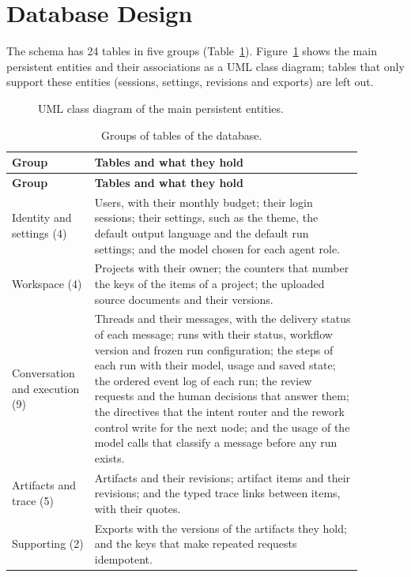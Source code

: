 \section{Database Design}
\label{sec:sd-database}

The schema has 24 tables in five groups (Table~\ref{tab:sd-tables}). Figure~\ref{fig:sd-domain-model} shows the main persistent entities and their associations as a UML class diagram; tables that only support these entities (sessions, settings, revisions and exports) are left out.

\begin{figure}[H]
    \centering
    \resizebox{\linewidth}{!}{}
    \caption{UML class diagram of the main persistent entities.}
    \label{fig:sd-domain-model}
\end{figure}

\begingroup{}
\begin{longtable}{|p{0.2\linewidth}|p{0.68\linewidth}|}
    \caption{Groups of tables of the database.}
    \label{tab:sd-tables} \\
    \hline
    \textbf{Group} & \textbf{Tables and what they hold} \\
    \hline
    \endfirsthead
    \hline
    \textbf{Group} & \textbf{Tables and what they hold} \\
    \hline
    \endhead
    Identity and settings (4) & Users, with their monthly budget; their login sessions; their settings, such as the theme, the default output language and the default run settings; and the model chosen for each agent role. \\ \hline
    Workspace (4) & Projects with their owner; the counters that number the keys of the items of a project; the uploaded source documents and their versions. \\ \hline
    Conversation and execution (9) & Threads and their messages, with the delivery status of each message; runs with their status, workflow version and frozen run configuration; the steps of each run with their model, usage and saved state; the ordered event log of each run; the review requests and the human decisions that answer them; the directives that the intent router and the rework control write for the next node; and the usage of the model calls that classify a message before any run exists. \\ \hline
    Artifacts and trace (5) & Artifacts and their revisions; artifact items and their revisions; and the typed trace links between items, with their quotes. \\ \hline
    Supporting (2) & Exports with the versions of the artifacts they hold; and the keys that make repeated requests idempotent. \\ \hline
\end{longtable}
\endgroup

